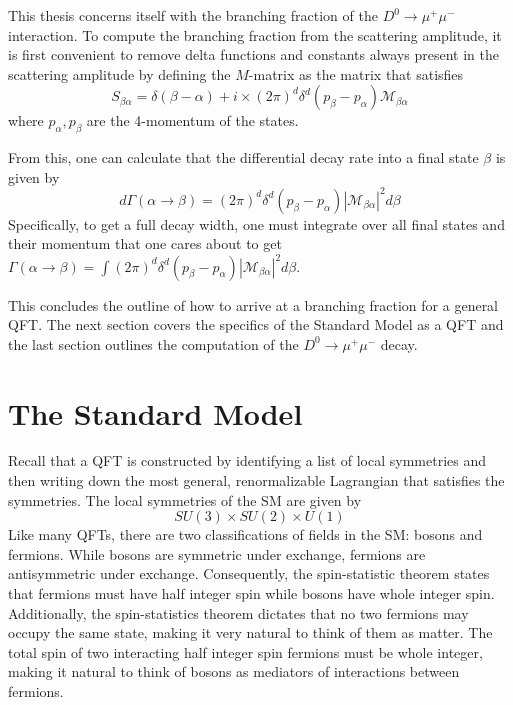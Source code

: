 This thesis concerns itself with the branching fraction of the $D^0 \to \mu^+ \mu^-$ interaction. To compute the branching fraction from the scattering amplitude, it is first convenient to remove delta functions and constants always present in the scattering amplitude by defining the $M$-matrix as the matrix that satisfies
\begin{equation}
S_{\beta \alpha} = \delta(\beta -\alpha) + i \times(2\pi)^d \delta^d(p_{\beta}-p_{\alpha}) \mathcal{M}_{\beta \alpha}
\end{equation}
where $p_{\alpha}, p_{\beta}$ are the 4-momentum of the states. 

From this, one can calculate that the differential decay rate into a final state $\beta$ is given by
\begin{equation}
d \Gamma(\alpha \to \beta) = (2\pi)^d \delta^d(p_{\beta}-p_{\alpha}) |\mathcal{M}_{\beta \alpha}|^2 d \beta
\end{equation}
Specifically, to get a full decay width, one must integrate over all final states and their momentum that one cares about to get $\Gamma(\alpha \to \beta) = \int (2\pi)^d \delta^d(p_{\beta}-p_{\alpha}) |\mathcal{M}_{\beta \alpha}|^2 d \beta$. 

This concludes the outline of how to arrive at a branching fraction for a general QFT. The next section covers the specifics of the Standard Model as a QFT and the last section outlines the computation of the $D^0 \to \mu^+ \mu^-$ decay. 

\section{The Standard Model}

Recall that a QFT is constructed by identifying a list of local symmetries and then writing down the most general, renormalizable Lagrangian that satisfies the symmetries. The local symmetries of the SM are given by
\begin{equation}
SU(3) \times SU(2) \times U(1)
\end{equation}
Like many QFTs, there are two classifications of fields in the SM: bosons and fermions. While bosons are symmetric under exchange, fermions are antisymmetric under exchange. Consequently, the spin-statistic theorem states that fermions must have half integer spin while bosons have whole integer spin. Additionally, the spin-statistics theorem dictates that no two fermions may occupy the same state, making it very natural to think of them as matter. The total spin of two interacting half integer spin fermions must be whole integer, making it natural to think of bosons as mediators of interactions between fermions. 

